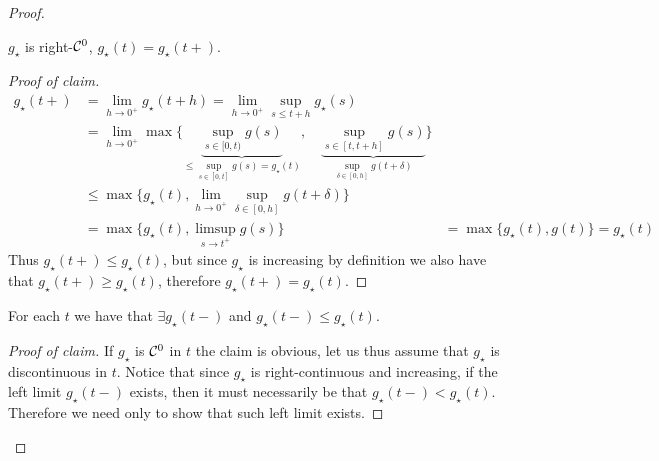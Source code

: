 \begin{proof}
	\begin{claim}
		$g_\star$ is right-$\mathcal{C}^0$, \ie $g_\star(t) = g_\star(t+)$.
	\end{claim}
	\begin{proof}[Proof of claim]
		\begin{equation*}
		\begin{aligned}
			g_\star(t+) 
			&= \lim_{h \rightarrow 0^+} g_\star(t+h) = \lim_{h \rightarrow 0^+} \sup_{s \leq t+h} g_\star(s)
			\\
			&= \lim_{h \rightarrow 0^+} \max \Big\{ 
				\underbrace{\sup_{s\in [0,t)} g(s)}_{\leq \sup_{s\in [0,t]} g(s) = g_\star(t)}
				,\quad
				\underbrace{\sup_{s \in [t, t+h]} g(s) }_{
					\sup_{\delta \in [0, h]} g(t+\delta) 
					}
			\Big\}			
			\\
			& \leq \max \{ g_\star (t), \lim_{h\rightarrow 0^+} \sup_{\delta \in [0, h]} g(t+\delta) \}
			\\
			& = \max \{ g_\star (t), \limsup_{s\rightarrow t^+} g(s) \}
			& = \max \{ g_\star (t), g(t) \} = g_\star(t)
		\end{aligned}
		\end{equation*}
		Thus $g_\star(t+) \leq g_\star(t)$, but since $g_\star$ is increasing by definition we also have that $g_\star(t+) \geq g_\star(t)$, therefore $g_\star(t+) = g_\star(t)$.
	\end{proof}
	\begin{claim}
		For each $t$ we have that $\exists g_\star(t-)$ and $g_\star(t-) \leq g_\star(t)$.
	\end{claim}
	\begin{proof}[Proof of claim]
		If $g_\star$ is $\mathcal{C}^0$ in $t$ the claim is obvious, let us thus assume that $g_\star$ is discontinuous in $t$.
		Notice that since $g_\star$ is right-continuous and increasing, if the left limit $g_\star (t-)$ exists, then it must necessarily be that $g_\star(t-) < g_\star(t)$.
		Therefore we need only to show that such left limit exists.
		

\end{proof}
\end{proof}
